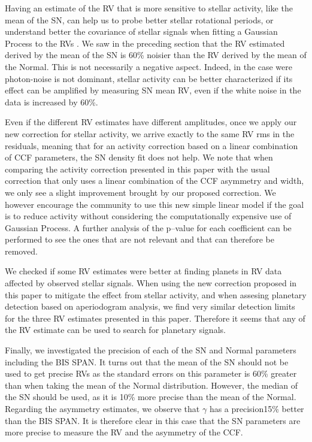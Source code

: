 \documentclass{aa}
\begin{document}
Having an estimate of the RV that is more sensitive to stellar activity, like the mean of the SN, can help us to probe better stellar rotational periods, or understand better the covariance of stellar signals when fitting a Gaussian Process to the RVs \citep[e.g.][]{Faria-2016a, Haywood-2014}. We saw in the preceding section that the RV estimated derived by the mean of the SN is 60\% noisier than the RV derived by the mean of the Normal. This is not necessarily a negative aspect. Indeed, in the case were photon-noise is not dominant, stellar activity can be better characterized if its effect can be amplified by measuring SN mean RV, even if the white noise in the data is increased by 60\%.

Even if the different RV estimates have different amplitudes, once we apply our new correction for stellar activity, we arrive exactly to the same RV rms in the residuals, meaning that for an activity correction based on a linear combination of CCF parameters, the SN density fit does not help. We note that when comparing the activity correction presented in this paper with the usual correction that only uses a linear combination of the CCF asymmetry and width, we only see a slight improvement brought by our proposed correction. We however encourage the community to use this new simple linear model if the goal is to reduce activity without considering the computationally expensive use of Gaussian Process. A further analysis of the p--value for each coefficient can be performed to see the ones that are not relevant and that can therefore be removed.

We checked if some RV estimates were better at finding planets in RV data affected by observed stellar signals. When using the new correction proposed in this paper to mitigate the effect from stellar activity, and when assesing planetary detection based on aperiodogram analysis, we find very similar detection limits for the three RV estimates presented in this paper. Therefore it seems that any of the RV estimate can be used to search for planetary signals.

Finally, we investigated the precision of each of the SN and Normal parameters including the BIS SPAN. It turns out that the mean of the SN should not be used to get precise RVs as the standard errors on this parameter is 60\% greater than when taking the mean of the Normal distribution. However, the median of the SN should be used, as it is 10\% more precise than the mean of the Normal. Regarding the asymmetry estimates, we observe that $\gamma$ has a precision15\% better than the BIS SPAN. It is therefore clear in this case that the SN parameters are more precise to measure the RV and the asymmetry of the CCF.
\end{document}
